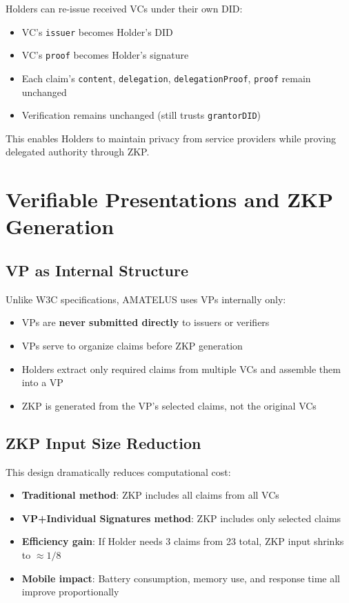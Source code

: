 Holders can re-issue received VCs under their own DID:

\begin{itemize}
  \item VC's \texttt{issuer} becomes Holder's DID
  \item VC's \texttt{proof} becomes Holder's signature
  \item Each claim's \texttt{content}, \texttt{delegation}, \texttt{delegationProof}, \texttt{proof} remain unchanged
  \item Verification remains unchanged (still trusts \texttt{grantorDID})
\end{itemize}

This enables Holders to maintain privacy from service providers while proving delegated authority through ZKP.

\section{Verifiable Presentations and ZKP Generation}

\subsection{VP as Internal Structure}

Unlike W3C specifications, AMATELUS uses VPs internally only:

\begin{itemize}
  \item VPs are \textbf{never submitted directly} to issuers or verifiers
  \item VPs serve to organize claims before ZKP generation
  \item Holders extract only required claims from multiple VCs and assemble them into a VP
  \item ZKP is generated from the VP's selected claims, not the original VCs
\end{itemize}

\subsection{ZKP Input Size Reduction}

This design dramatically reduces computational cost:

\begin{itemize}
  \item \textbf{Traditional method}: ZKP includes all claims from all VCs
  \item \textbf{VP+Individual Signatures method}: ZKP includes only selected claims
  \item \textbf{Efficiency gain}: If Holder needs 3 claims from 23 total, ZKP input shrinks to $\approx 1/8$
  \item \textbf{Mobile impact}: Battery consumption, memory use, and response time all improve proportionally
\end{itemize}

